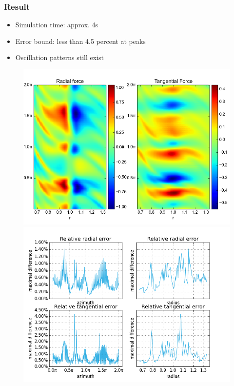 \documentclass{beamer}
\begin{document}
\begin{frame}
 \frametitle{Result}
\begin{itemize}
  \item Simulation time: approx. 4s
  \item Error bound: less than 4.5 percent at peaks
  \item Oscillation patterns still exist
 \end{itemize}

 \begin{figure}[H]
  \centering
  \includegraphics[width=.5\textwidth]{../../../Sara/run/default/forcesA-euclid.png}     \includegraphics[width=.5\textwidth]{../../../Sara/run/default/diff_1D.png}
\end{figure}
\end{frame}
\end{document}

